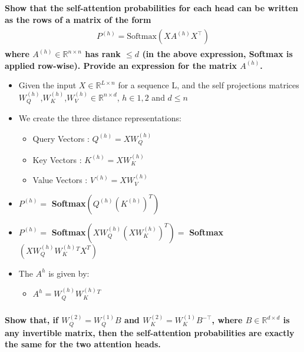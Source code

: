 \documentclass{article}
\begin{document}
\subsubsection{}
\textbf{Show that the self-attention probabilities for each head can be written as the rows of a matrix of the form
\begin{align}
    \begin{split}
        P^{(h)} = \text{Softmax}(XA^{(h)}X^{\top})
    \end{split}
\end{align}
where $A^{(h)} \in \mathbb{R}^{n \times n}$ has rank $\leq d$ (in the above expression, Softmax is applied row-wise). Provide an expression for the matrix $A^{(h)}$.
}
\begin{itemize}
    \item Given the input $X \in \mathbb{R}^{L \times n}$ for a sequence L, and the self projections matrices $W^{(h)}_Q$,$W^{(h)}_K$,$W^{(h)}_V \in \mathbb{R}^{n \times d}$, $h \in \mathbb{}{{1,2}}$ and $d\leqslant n$
    \item We create the three distance representations:
    \begin{itemize}
        \item Query Vectors : $Q^{(h)} = X W^{(h)}_Q$
         \item Key Vectors : $K^{(h)} = X W^{(h)}_K$
          \item Value Vectors : $V^{(h)} = X W^{(h)}_V$
    \end{itemize}
    \item $P^{(h)} =$ \textbf{Softmax}$(Q^{(h)}(K^{(h)})^{T})$
    \item $P^{(h)} =$ \textbf{Softmax}$(XW^{(h)}_Q(XW^{(h)}_K)^{T}) = $ \textbf{Softmax} $(XW^{(h)}_Q W^{(h)}_K^{T} X^{T})$ 
    \item The $A^{h}$ is given by:
    \begin{itemize}
        \item $A^{h} = W^{(h)}_Q W^{(h)}_K^{T} $
    \end{itemize}
\end{itemize}

\subsubsection{}
\textbf{Show that, if $W^{(2)}_Q = W^{(1)}_Q B$ and $W^{(2)}_K = W^{(1)}_K B^{-\top}$, where $B \in \mathbb{R}^{d \times d}$ is any invertible matrix, then the self-attention probabilities are exactly the same for the two attention heads.}
\end{document}
